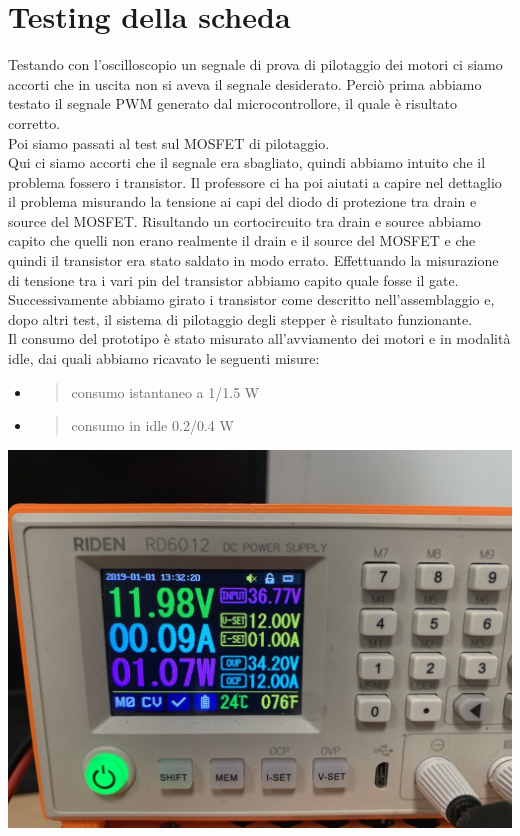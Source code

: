 \chapter{Testing della scheda}

Testando con l’oscilloscopio un segnale di prova di pilotaggio dei motori ci 
siamo accorti che in uscita non si aveva il segnale desiderato. 
Perciò prima abbiamo testato il segnale PWM generato dal microcontrollore, 
il quale è risultato corretto.\\
Poi siamo passati al test sul MOSFET di pilotaggio.\\
Qui ci siamo accorti che il segnale era sbagliato, quindi abbiamo intuito che il problema fossero i transistor.
Il professore ci ha poi aiutati a capire nel dettaglio il problema misurando la tensione ai capi del diodo di
protezione tra drain e source del MOSFET. Risultando un cortocircuito tra drain e source abbiamo capito che 
quelli non erano realmente il drain e il source del MOSFET e che quindi il transistor era stato saldato in 
modo errato. Effettuando la misurazione di tensione tra i vari pin del transistor abbiamo capito quale fosse il gate.
Successivamente abbiamo girato i transistor come descritto nell’assemblaggio e, dopo altri test, il sistema di pilotaggio
degli stepper è risultato funzionante.\\
Il consumo del prototipo è stato misurato all’avviamento dei motori e in modalità idle, dai quali abbiamo ricavato le seguenti misure:

\begin{itemize}
\item
    \begin{quote}
    consumo istantaneo a 1/1.5 W
    \end{quote}
\item
    \begin{quote}
    consumo in idle 0.2/0.4 W
    \end{quote}
\end{itemize}

\begin{center}
\includegraphics[scale=0.3]{figures/image3.png}
\captionsetup{type=figure}
\end{center}

